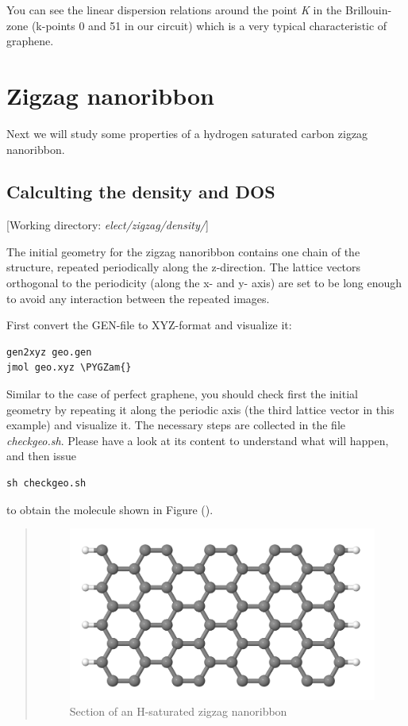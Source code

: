 \documentclass[a4paper,11pt,english]{sphinxmanual}
\def\PYGZam{\char`\&}
\begin{document}
{{You can see the linear dispersion relations around the point \emph{K} in
the Brillouin-zone (k-points 0 and 51 in our circuit) which is a very
typical characteristic of graphene.


\section{Zigzag nanoribbon}
\label{electstruct:zigzag-nanoribbon}
Next we will study some properties of a hydrogen saturated carbon
zigzag nanoribbon.


\subsection{Calculting the density and DOS}
\label{electstruct:calculting-the-density-and-dos}
{[}Working directory: \emph{elect/zigzag/density/}{]}

The initial geometry for the zigzag nanoribbon contains one chain of
the structure, repeated periodically along the z-direction. The
lattice vectors orthogonal to the periodicity (along the x- and y-
axis) are set to be long enough to avoid any interaction between the
repeated images.

First convert the GEN-file to XYZ-format and visualize it:

\begin{Verbatim}[commandchars=\\\{\}]
gen2xyz geo.gen
jmol geo.xyz \PYGZam{}
\end{Verbatim}

Similar to the case of perfect graphene, you should check first the
initial geometry by repeating it along the periodic axis (the third
lattice vector in this example) and visualize it. The necessary steps
are collected in the file \emph{checkgeo.sh}. Please have a look at its
content to understand what will happen, and then issue

\begin{Verbatim}[commandchars=\\\{\}]
sh checkgeo.sh
\end{Verbatim}

to obtain the molecule shown in Figure {\hyperref[electstruct:fig-zigzag-114]{\emph{}}} ().
\begin{quote}
\begin{figure}[htbp]
\centering
\capstart

\includegraphics[width=0.600\linewidth]{geo-zigzag-114.png}
\caption{Section of an H-saturated zigzag nanoribbon}\label{electstruct:fig-zigzag-114}\end{figure}
\end{quote}

}}
\end{document}
